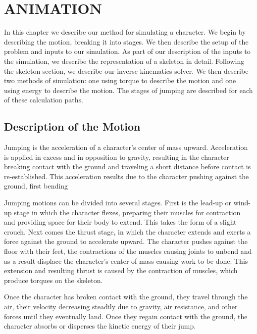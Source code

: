  
\chapter{ANIMATION}
\label{chapter:animation}
In this chapter we describe our method for simulating a character.  We begin by describing the motion, breaking it into stages.  We then describe the setup of the problem and inputs to our simulation.  As part of our description of the inputs to the simulation, we describe the representation of a skeleton in detail.  Following the skeleton section, we describe our inverse kinematics solver.  We then describe two methods of simulation: one using torque to describe the motion and one using energy to describe the motion.  The stages of jumping are described for each of these calculation paths.

\section{Description of the Motion}
\label{section:motion_desc}
Jumping is the acceleration of a character's center of mass upward.  Acceleration is applied in excess and in opposition to gravity, resulting in the character breaking contact with the ground and traveling a short distance before contact is re-established.  This acceleration results due to the character pushing against the ground, first bending

Jumping motions can be divided into several stages.  First is the lead-up or wind-up stage in which the character flexes, preparing their muscles for contraction and providing space for their body to extend.  This takes the form of a slight crouch.  Next comes the thrust stage, in which the character extends and exerts a force against the ground to accelerate upward.  The character pushes against the floor with their feet, the contractions of the muscles causing joints to unbend and as a result displace the character's center of mass causing work to be done.  This extension and resulting thrust is caused by the contraction of muscles, which produce torques on the skeleton.

Once the character has broken contact with the ground, they travel through the air, their velocity decreasing steadily due to gravity, air resistance, and other forces until they eventually land.  Once they regain contact with the ground, the character absorbs or disperses the kinetic energy of their jump.

